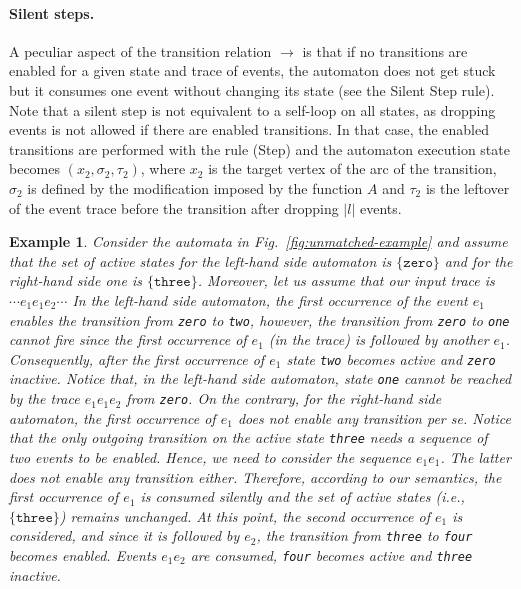 \documentclass{sigplanconf}[10pt] %
\newtheorem{example}{Example}
\begin{document}
\paragraph{Silent steps.}
A peculiar aspect of the transition relation $\to$ is that if no transitions are enabled for a given state and trace of events, the automaton does not get stuck but it consumes one event without changing its state (see the  Silent Step rule).
Note that a silent step is not equivalent to a self-loop on all states, as dropping events is not allowed if there are enabled transitions.
In that case,  the enabled transitions are performed with the rule (Step) and the automaton execution state becomes $(x_2, \sigma_2,\tau_2)$, where $x_2$ is the target vertex of the arc of the transition, $\sigma_2$ is defined by the modification imposed by the function $A$ and $\tau_2$ is the leftover of the event trace before the transition after dropping $|l|$ events.
\begin{example}
Consider the automata in Fig.~\ref{fig:unmatched-example} and assume that the set of active states for the left-hand side automaton is $\{ \texttt{zero} \}$ and for the right-hand side one is $\{ \texttt{three}\}$.
Moreover, let us assume that our input trace is $\cdots e_1 e_1 e_2 \cdots$ In the left-hand side automaton, the first occurrence of the event $e_1$ enables the transition  from {\tt zero} to {\tt two}, however, the transition from {\tt zero} to {\tt one} cannot fire since the first occurrence of $e_1$ (in the trace) is followed by another $e_1$.
Consequently, after the first occurrence of $e_1$ state {\tt two} becomes active and {\tt zero} inactive.
Notice that, in the left-hand side automaton, state {\tt one} cannot be reached by the trace $e_1 e_1 e_2 $ from {\tt zero}.
On the contrary, for the right-hand side automaton, the first occurrence of $e_1$ does not enable any transition per se.
Notice that the only outgoing transition on the active state {\tt three} needs a sequence of two events to be enabled.
Hence, we need to consider the sequence $e_1e_1$.
The latter does not enable any transition either.
Therefore, according to our semantics,  the first occurrence of $e_1$ is consumed silently and the set of active states (i.e., $\{ \texttt{three} \}$) remains unchanged.
At this point, the second occurrence of $e_1$ is considered, and since it is followed by $e_2$, the transition from {\tt three} to {\tt four} becomes enabled.
Events $e_1e_2$ are consumed, {\tt four} becomes active and {\tt three} inactive.
\end{example}
\end{document}

